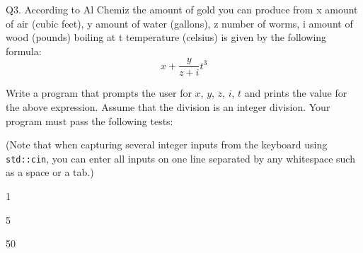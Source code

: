 Q3. According to Al Chemiz the amount of gold you can produce from 
x amount of air (cubic feet), 
y amount of water (gallons), 
z number of worms, 
i amount of wood (pounds) boiling at t temperature (celsius) is given by the following formula:
\[
x + \frac{y}{z+i} t^3
\]

Write a program that prompts the user for $x$, $y$, $z$, $i$, $t$ 
and prints the value for the above expression. 
Assume that the division is an integer division. 
Your program must pass the following tests:

(Note that when capturing several integer inputs from the keyboard using 
\verb!std::cin!, you can enter all inputs on one line separated by any 
whitespace such as a space or a tab.)

\resett
\nextt
\begin{console}[commandchars=\\\{\}]
1
\end{console}

\nextt
\begin{console}[commandchars=\\\{\}]
5
\end{console}

\nextt
\begin{console}[commandchars=\\\{\}]
50
\end{console}
